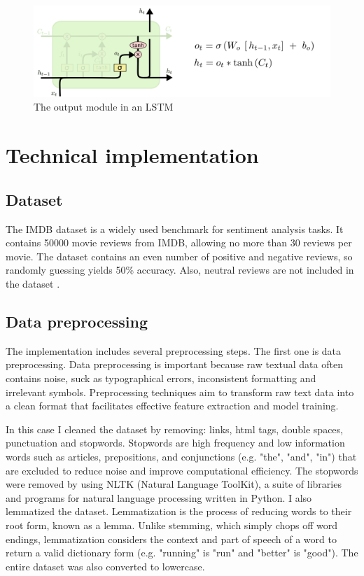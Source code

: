 \documentclass{article}
\begin{document}
\begin{figure}[htbp]
  \centering
  \includegraphics[width=0.6\linewidth]{img/lstm_output.png}
  \caption{The output module in an LSTM}
  \label{fig:lstm_output}
\end{figure}



\section{Technical implementation}

\subsection{Dataset}

The IMDB dataset is a widely used benchmark for sentiment analysis tasks.
It contains 50000 movie reviews from IMDB, allowing no more than 30 reviews per movie.
The dataset contains an even number of positive and negative reviews, so randomly guessing yields 50\% accuracy.
Also, neutral reviews are not included in the dataset \cite{imdb_dataset_stanfordnlp}.

\subsection{Data preprocessing}

The implementation includes several preprocessing steps.
The first one is data preprocessing.
Data preprocessing is important because raw textual data often contains noise, suck as typographical errors, inconsistent formatting and irrelevant symbols.
Preprocessing techniques aim to transform raw text data into a clean format that facilitates effective feature extraction and model training.

In this case I cleaned the dataset by removing: links, html tags, double spaces, punctuation and stopwords.
Stopwords are high frequency and low information words such as articles, prepositions, and conjunctions (e.g. "the", "and", "in") that are excluded to reduce noise and improve computational efficiency.
The stopwords were removed by using NLTK (Natural Language ToolKit), a suite of libraries and programs for natural language processing written in Python.
I also lemmatized the dataset.
Lemmatization is the process of reducing words to their root form, known as a lemma.
Unlike stemming, which simply chops off word endings, lemmatization considers the context and part of speech of a word to return a valid dictionary form (e.g. "running" is "run" and "better" is "good").
The entire dataset was also converted to lowercase.
\end{document}
